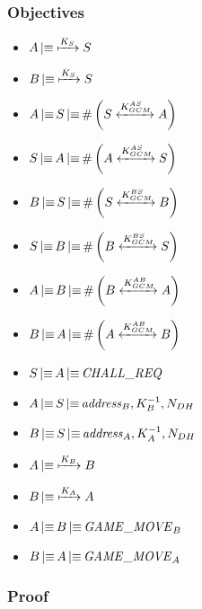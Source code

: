 \subsubsection{Objectives}

\begin{itemize}
	\item \(A \believes \pubkey{K_S} S\)
	\item \(B \believes \pubkey{K_S} S\)
	\item \(A \believes S \believes \fresh{S \sharedkey{K_{GCM}^{AS}} A}\)
	\item \(S \believes A \believes \fresh{A \sharedkey{K_{GCM}^{AS}} S}\)
	\item \(B \believes S \believes \fresh{S \sharedkey{K_{GCM}^{BS}} B}\)
	\item \(S \believes B \believes \fresh{B \sharedkey{K_{GCM}^{BS}} S}\)
	\item \(A \believes B \believes \fresh{B \sharedkey{K_{GCM}^{AB}} A}\)
	\item \(B \believes A \believes \fresh{A \sharedkey{K_{GCM}^{AB}} B}\)
	\item \(S \believes A \believes \mathit{CHALL\_REQ}\)
	\item \(A \believes S \believes \mathit{address}_B, K_B^{-1}, N_{DH}\)
	\item \(B \believes S \believes \mathit{address}_A, K_A^{-1}, N_{DH}\)
	\item \(A \believes \pubkey{K_B} B\)
	\item \(B \believes \pubkey{K_A} A\)
	\item \(A \believes B \believes \mathit{GAME\_MOVE}_B\)
	\item \(B \believes A \believes \mathit{GAME\_MOVE}_A\)
\end{itemize}

\subsubsection{Proof}
